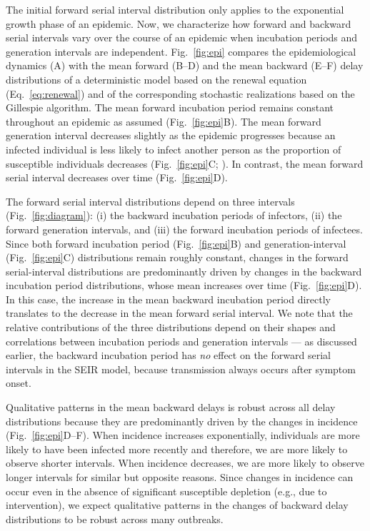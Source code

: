 \documentclass[12pt]{article}
\newcommand{\eref}[1]{Eq.~\ref{eq:#1}}
\newcommand{\fref}[1]{Fig.~\ref{fig:#1}}
\begin{document}
The initial forward serial interval distribution only applies to the exponential growth phase of an epidemic.
Now, we characterize how forward and backward serial intervals vary over the course of an epidemic when incubation periods and generation intervals are independent.
\fref{epi} compares the epidemiological dynamics (A) with the mean forward (B--D) and the mean backward (E--F) delay distributions of a deterministic model based on the renewal equation (\eref{renewal}) and of the corresponding stochastic realizations based on the Gillespie algorithm.
The mean forward incubation period remains constant throughout an epidemic as assumed (\fref{epi}B).
The mean forward generation interval decreases slightly as the epidemic progresses because an infected individual is less likely to infect another person as the proportion of susceptible individuals decreases (\fref{epi}C; \cite{kenah2008generation, champredon2015intrinsic}).
In contrast, the mean forward serial interval decreases over time (\fref{epi}D).

The forward serial interval distributions depend on three intervals (\fref{diagram}): (i) the backward incubation periods of infectors, (ii) the forward generation intervals, and (iii) the forward incubation periods of infectees.
Since both forward incubation period (\fref{epi}B) and generation-interval (\fref{epi}C) distributions remain roughly constant, changes in the forward serial-interval distributions are predominantly driven by changes in the backward incubation period distributions, whose mean increases over time (\fref{epi}D). 
In this case, the increase in the mean backward incubation period directly translates to the decrease in the mean forward serial interval.
We note that the relative contributions of the three distributions depend on their shapes and correlations between incubation periods and generation intervals --- as discussed earlier, the backward incubation period has \emph{no} effect on the forward serial intervals in the SEIR model, because transmission always occurs after symptom onset.

Qualitative patterns in the mean backward delays is robust across all delay distributions because they are predominantly driven by the changes in incidence (\fref{epi}D--F).
When incidence increases exponentially, individuals are more likely to have been infected more recently and therefore, we are more likely to observe shorter intervals.
When incidence decreases, we are more likely to observe longer intervals for similar but opposite reasons.
Since changes in incidence can occur even in the absence of significant susceptible depletion (e.g., due to intervention), we expect qualitative patterns in the changes of backward delay distributions to be robust across many outbreaks.
\end{document}
